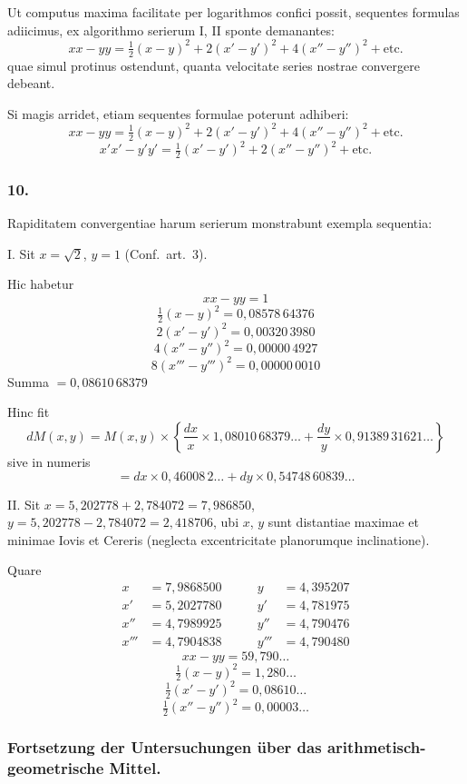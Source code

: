 \documentclass[12pt,a4paper]{article}
\begin{document}
Ut computus maxima facilitate per logarithmos confici possit, sequentes formulas adiicimus, ex algorithmo serierum I, II sponte demanantes:
\[
xx-yy = \tfrac{1}{2}(x-y)^2 + 2(x'-y')^2 + 4(x''-y'')^2 + \text{etc.}
\]
quae simul protinus ostendunt, quanta velocitate series nostrae convergere debeant.

Si magis arridet, etiam sequentes formulae poterunt adhiberi:
\[
xx-yy = \tfrac{1}{2}(x-y)^2 + 2(x'-y')^2 + 4(x''-y'')^2 + \text{etc.}
\]
\[
x'x'-y'y' = \tfrac{1}{2}(x'-y')^2 + 2(x''-y'')^2 + \text{etc.}
\]

\subsubsection*{10.}

Rapiditatem convergentiae harum serierum monstrabunt exempla sequentia:

\textsc{I.} Sit $x=\sqrt{2}$, $y=1$ (Conf.\ art.\ 3).

Hic habetur
\[
xx-yy = 1
\]
\[
\tfrac{1}{2}(x-y)^2 = 0{,}08578\,64376
\]
\[
2(x'-y')^2 = 0{,}00320\,3980
\]
\[
4(x''-y'')^2 = 0{,}00000\,4927
\]
\[
8(x'''-y''')^2 = 0{,}00000\,0010
\]
Summa $= 0{,}08610\,68379$

Hinc fit
\[
dM(x,y) = M(x,y)\times\left\{\frac{dx}{x}\times 1{,}08010\,68379\dots + \frac{dy}{y}\times 0{,}91389\,31621\dots\right\}
\]
sive in numeris
\[
= dx\times 0{,}46008\,2\dots + dy\times 0{,}54748\,60839\dots
\]

\textsc{II.} Sit $x = 5{,}202778 + 2{,}784072 = 7{,}986850$, $y = 5{,}202778 - 2{,}784072 = 2{,}418706$, ubi $x$, $y$ sunt distantiae maximae et minimae Iovis et Cereris (neglecta excentricitate planorumque inclinatione).

Quare
\[
\begin{aligned}
x &= 7{,}9868500 &\qquad y &= 4{,}395207 \\
x' &= 5{,}2027780 &\qquad y' &= 4{,}781975 \\
x'' &= 4{,}7989925 &\qquad y'' &= 4{,}790476 \\
x''' &= 4{,}7904838 &\qquad y''' &= 4{,}790480
\end{aligned}
\]
\[
xx-yy = 59{,}790\dots
\]
\[
\tfrac{1}{2}(x-y)^2 = 1{,}280\dots
\]
\[
\tfrac{1}{2}(x'-y')^2 = 0{,}08610\dots
\]
\[
\tfrac{1}{2}(x''-y'')^2 = 0{,}00003\dots
\]

\subsubsection*{Fortsetzung der Untersuchungen \"uber das arithmetisch-geometrische Mittel.}
\end{document}

